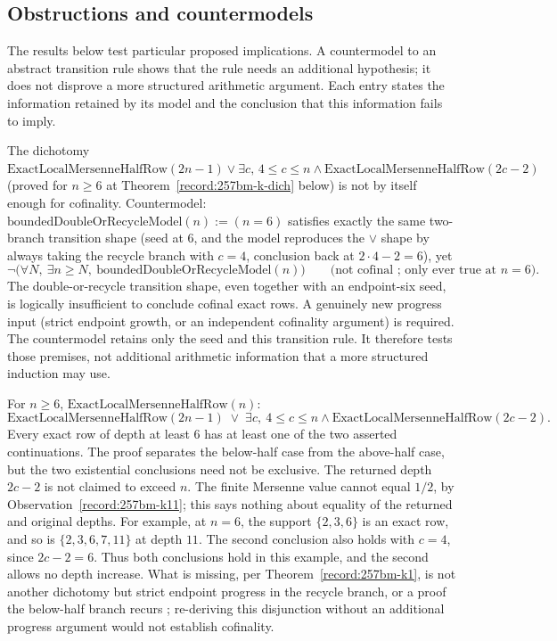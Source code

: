 \subsection{Obstructions and countermodels}

The results below test particular proposed implications.  A countermodel
to an abstract transition rule shows that the rule needs an additional
hypothesis; it does not disprove a more structured arithmetic
argument.  Each entry states the information retained by its model
and the conclusion that this information fails to imply.

\begin{thm}\label{record:257bm-k1}
The dichotomy $\mathrm{ExactLocalMersenneHalfRow}(2n{-}1) \vee \exists c,\,4\le c\le n\wedge
\mathrm{ExactLocalMersenneHalfRow}(2c{-}2)$ (proved for $n\ge6$ at Theorem~\ref{record:257bm-k-dich} below) is not by
itself enough for cofinality. Countermodel: $\mathrm{boundedDoubleOrRecycleModel}(n) := (n=6)$
satisfies exactly the same two-branch transition shape (seed at 6, and the
model reproduces the $\vee$ shape by always taking
the recycle branch with $c=4$, conclusion back at $2\cdot4-2=6$), yet
\[
\neg\big(\forall N,\ \exists n\ge N,\ \mathrm{boundedDoubleOrRecycleModel}(n)\big) \qquad \text{(not cofinal ;  only ever true at } n=6\text{)}.
\]
The
double-or-recycle transition shape, even together with an endpoint-six seed, is logically
insufficient to conclude cofinal exact rows. A genuinely new progress input (strict endpoint
growth, or an independent cofinality argument) is required. The countermodel retains only the seed and this transition rule.  It
therefore tests those premises, not additional arithmetic information
that a more structured induction may use.
\end{thm}

\begin{thm}\label{record:257bm-k-dich}
For $n\ge6$, $\mathrm{ExactLocalMersenneHalfRow}(n)$:
\[
\mathrm{ExactLocalMersenneHalfRow}(2n-1) \;\vee\; \exists c,\ 4\le c\le n \wedge \mathrm{ExactLocalMersenneHalfRow}(2c-2).
\]
Every exact row of depth at least $6$ has at least one of the two
asserted continuations.  The proof separates the below-half case from
the above-half case, but the two existential conclusions need not be
exclusive.  The returned depth $2c-2$ is not claimed to exceed $n$. The finite Mersenne value cannot equal $1/2$, by
Observation~\ref{record:257bm-k11}; this says nothing about equality
of the returned and original depths.  For example, at $n=6$, the
support $\{2,3,6\}$ is an exact row, and so is
$\{2,3,6,7,11\}$ at depth $11$.  The second conclusion also holds
with $c=4$, since $2c-2=6$.  Thus both conclusions hold in this example,
and the second allows no depth increase.  What is
missing, per Theorem~\ref{record:257bm-k1}, is not another dichotomy but strict endpoint progress in the recycle
branch, or a proof the below-half branch recurs ;  re-deriving this disjunction without an additional progress argument
would not establish cofinality.
\end{thm}

